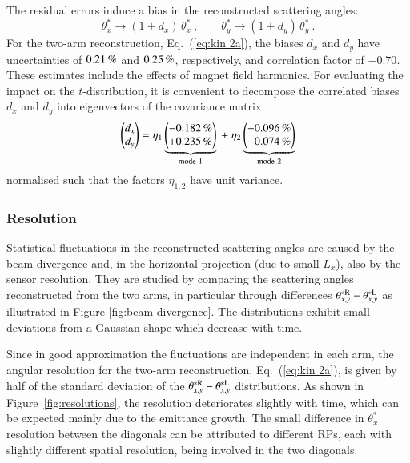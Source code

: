The residual errors induce a bias in the reconstructed scattering angles:
\begin{equation}
\label{eq:opt bias}
	\theta_x^* \rightarrow (1 + d_x)\, \theta_x^*\ ,\qquad
	\theta_y^* \rightarrow (1 + d_y)\, \theta_y^*\ .
\end{equation}
For the two-arm reconstruction, Eq.~(\ref{eq:kin 2a}), the biases $d_x$ and $d_y$ have uncertainties of $0.21\,{\rm \%}$ and $0.25\,{\rm \%}$, respectively, and correlation factor of $-0.70$. These estimates include the effects of magnet field harmonics. For evaluating the impact on the $t$-distribution, it is convenient to decompose the correlated biases $d_x$ and $d_y$ into eigenvectors of the covariance matrix:
\begin{equation}
\label{eq:opt bias modes}
\begin{pmatrix} d_x\cr d_y \end{pmatrix} =
	\eta_1 \underbrace{\begin{pmatrix} -0.182\,{\rm \%} \cr +0.235\,{\rm \%} \end{pmatrix}}_{\rm mode\ 1}
	\ +\ \eta_2 \underbrace{\begin{pmatrix} -0.096\,{\rm \%} \cr -0.074\,{\rm \%} \end{pmatrix}}_{\rm mode\ 2}
\end{equation}
normalised such that the factors $\eta_{1,2}$ have unit variance.


\subsubsection{Resolution}
\label{sec:resolution}

Statistical fluctuations in the reconstructed scattering angles are caused by the beam divergence and, in the horizontal projection (due to small $L_x$), also by the sensor resolution. They are studied by comparing the scattering angles reconstructed from the two arms, in particular through differences $\theta_{x,y}^{*\rm R} - \theta_{x,y}^{*\rm L}$ as illustrated in Figure \ref{fig:beam divergence}. The distributions exhibit small deviations from a Gaussian shape which decrease with time.

Since in good approximation the fluctuations are independent in each arm, the angular resolution for the two-arm reconstruction, Eq.~(\ref{eq:kin 2a}), is given by half of the standard deviation of the $\theta_{x,y}^{*\rm R} - \theta_{x,y}^{*\rm L}$ distributions. As shown in Figure~\ref{fig:resolutions}, the resolution deteriorates slightly with time, which can be expected mainly due to the emittance growth. The small difference in $\theta_x^*$ resolution between the diagonals can be attributed to different RPs, each with slightly different spatial resolution, being involved in the two diagonals.

